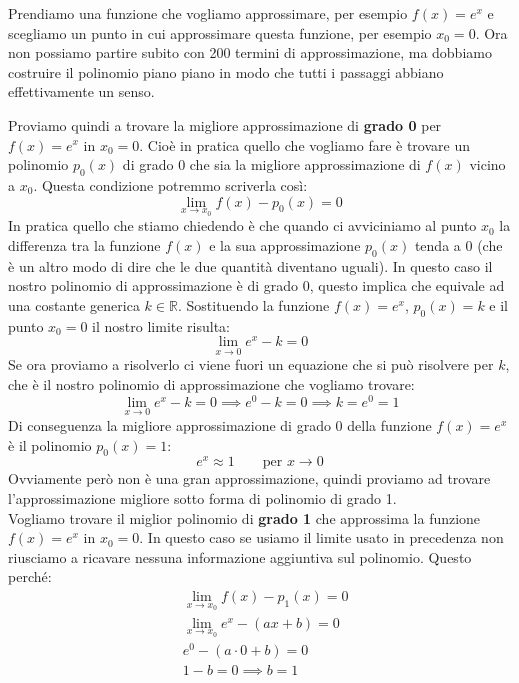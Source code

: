 Prendiamo una funzione che vogliamo approssimare, per esempio $f(x) = e^x$ e scegliamo un punto in cui approssimare questa funzione, per esempio $x_0 = 0$. Ora non possiamo partire subito con 200 termini di approssimazione, ma dobbiamo costruire il polinomio piano piano in modo che tutti i passaggi abbiano effettivamente un senso. 

Proviamo quindi a trovare la migliore approssimazione di \textbf{grado 0} per $f(x) = e^x$ in $x_0 = 0$. Cioè in pratica quello che vogliamo fare è trovare un polinomio $p_0(x)$ di grado $0$ che sia la migliore approssimazione di $f(x)$ vicino a $x_0$. Questa condizione potremmo scriverla così:
\begin{equation*}
	\lim_{x \to x_0} f(x) - p_0(x) = 0
\end{equation*}
In pratica quello che stiamo chiedendo è che quando ci avviciniamo al punto $x_0$ la differenza tra la funzione $f(x)$ e la sua approssimazione $p_0(x)$ tenda a 0 (che è un altro modo di dire che le due quantità diventano uguali). In questo caso il nostro polinomio di approssimazione è di grado 0, questo implica che equivale ad una costante generica $k \in \mathbb{R}$. Sostituendo la funzione $f(x) = e^x$, $p_0(x) = k$ e il punto $x_0 = 0$ il nostro limite risulta:
\begin{equation*}
	\lim_{x \to 0} e^x - k  = 0
\end{equation*}
Se ora proviamo a risolverlo ci viene fuori un equazione che si può risolvere per $k$, che è il nostro polinomio di approssimazione che vogliamo trovare:
\begin{equation*}
	\lim_{x \to 0} e^x - k  = 0 \implies e^0 - k  = 0 \implies k = e^0 = 1
\end{equation*}
Di conseguenza la migliore approssimazione di grado 0 della funzione $f(x) = e^x$ è il polinomio $p_0(x) = 1$:
\begin{equation*}
	e^x \approx 1 \qquad \text{per } x \to 0
\end{equation*}
Ovviamente però non è una gran approssimazione, quindi proviamo ad trovare l'approssimazione migliore sotto forma di polinomio di grado 1.\\

Vogliamo trovare il miglior polinomio di \textbf{grado 1} che approssima la funzione $f(x) = e^x$ in $x_0 = 0$. In questo caso se usiamo il limite usato in precedenza non riusciamo a ricavare nessuna informazione aggiuntiva sul polinomio. Questo perché:
\begin{align*}
	&\lim_{x \to x_0} f(x) - p_1(x) = 0\\
	&\lim_{x \to x_0} e^x - (ax + b) = 0\\
	&e^0 - (a \cdot 0 + b) = 0\\
	&1 - b = 0 \implies b = 1
\end{align*}

